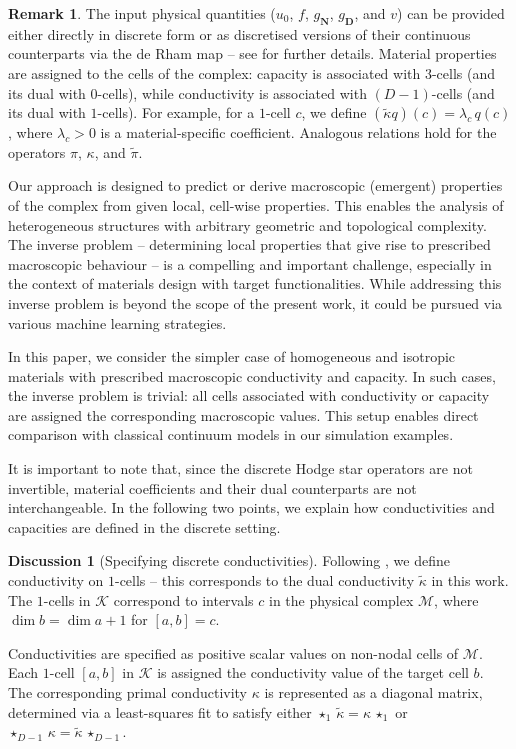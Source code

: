 \documentclass{elsarticle}
\theoremstyle{definition}
\newtheorem{discussion}[theorem]{Discussion}
\newtheorem{remark}[theorem]{Remark}
\newcommand{\Dirichlet}{\mathbf{D}}
\newcommand{\Neumann}{\mathbf{N}}
\begin{document}
\begin{remark}
  The input physical quantities ($u_0$, $f$, $g_\Neumann$, $g_\Dirichlet$, and $v$) can be provided either directly in discrete form or as discretised versions of their continuous counterparts via the de Rham map -- see  for further details. Material properties are assigned to the cells of the complex: capacity is associated with $3$-cells (and its dual with $0$-cells), while conductivity is associated with $(D-1)$-cells (and its dual with $1$-cells).   For example, for a $1$-cell $c$, we define $(\tilde{\kappa} q)(c) = \lambda_c\, q(c)$, where $\lambda_c > 0$ is a material-specific coefficient. Analogous relations hold for the operators $\pi$, $\kappa$, and $\tilde{\pi}$.

  Our approach is designed to predict or derive macroscopic (emergent) properties of the complex from given local, cell-wise properties. This enables the analysis of heterogeneous structures with arbitrary geometric and topological complexity. The inverse problem -- determining local properties that give rise to prescribed macroscopic behaviour -- is a compelling and important challenge, especially in the context of materials design with target functionalities. While addressing this inverse problem is beyond the scope of the present work, it could be pursued via various machine learning strategies.

  In this paper, we consider the simpler case of homogeneous and isotropic materials with prescribed macroscopic conductivity and capacity. In such cases, the inverse problem is trivial: all cells associated with conductivity or capacity are assigned the corresponding macroscopic values. This setup enables direct comparison with classical continuum models in our simulation examples.

  It is important to note that, since the discrete Hodge star operators are not invertible, material coefficients and their dual counterparts are not interchangeable. In the following two points, we explain how conductivities and capacities are defined in the discrete setting.
\end{remark}
\begin{discussion}[Specifying discrete conductivities]
  Following \cite{berbatov2022diffusion}, we define conductivity on $1$-cells -- this corresponds to the dual conductivity $\tilde{\kappa}$ in this work. The $1$-cells in $\mathcal{K}$ correspond to intervals $c$ in the physical complex $\mathcal{M}$, where $\dim b = \dim a + 1$ for $[a, b] = c$.

  Conductivities are specified as positive scalar values on non-nodal cells of $\mathcal{M}$. Each $1$-cell $[a, b]$ in $\mathcal{K}$ is assigned the conductivity value of the target cell $b$. The corresponding primal conductivity $\kappa$ is represented as a diagonal matrix, determined via a least-squares fit to satisfy either
  $\star_1 \, \tilde{\kappa} = \kappa \, \star_1$ or
  $\star_{D - 1} \, \kappa = \tilde{\kappa} \, \star_{D - 1}$.
\end{discussion}
\end{document}
